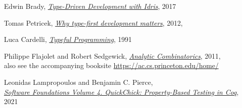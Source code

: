 \documentclass[declaration,mgr,english,shortabstract]{iithesis}
\begin{document}
\begin{thebibliography}{1}
    Edwin Brady,
    \href{https://www.manning.com/books/type-driven-development-with-idris}{\textit{Type-Driven Development with Idris}},
    2017

    Tomas Petricek,
    \href{http://tomasp.net/blog/type-first-development.aspx/}{\textit{Why type-first development matters}}, 2012, \\

    Luca Cardelli,
    \href{http://www.lucacardelli.name/Papers/TypefulProg.pdf}{\textit{Typeful Programming}}, 1991

    Philippe Flajolet and Robert Sedgewick,
    \href{https://ac.cs.princeton.edu/home/AC.pdf}{\textit{Analytic Combinatorics}},
    2011, \\
    also see the accompanying booksite \url{https://ac.cs.princeton.edu/home/}

    Leonidas Lampropoulos and Benjamin C. Pierce, \\
    \href{https://softwarefoundations.cis.upenn.edu/qc-current/Preface.html}{\textit{Software Foundations Volume 4. QuickChick: Property-Based Testing in Coq}},
    2021

\end{thebibliography}
\end{document}
